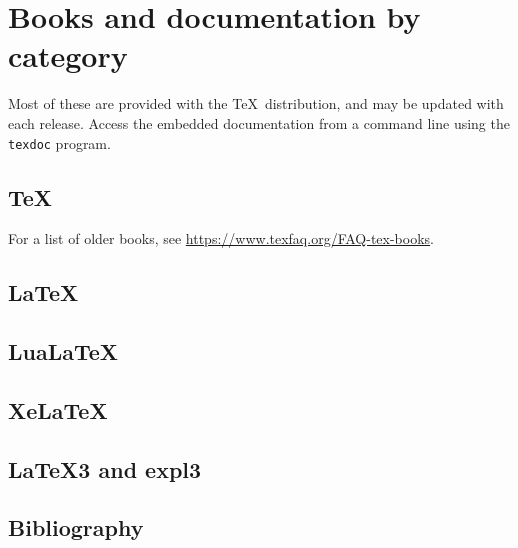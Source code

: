 \documentclass{article}
\newcommand*{\XeTeXrevE}
{\protect\hspace{-.1667em}\protect\raisebox{-.5ex}{\protect\reflectbox{E}}\protect\hspace{-.125em}}
\providecommand*{\XeLaTeX}{\mbox{X\XeTeXrevE\LaTeX}}
\def\pkg#1{#1}%
\def\TeX{TeX}%
\def\LaTeX{LaTeX}%
\def\XeLaTeX{XeLaTeX}%
\renewcommand*{\pkg}[1]{#1}
\renewcommand*{\XeLaTeX}{XeLaTeX}
\renewcommand*{\TeX}{TeX}
\renewcommand*{\LaTeX}{LaTeX}
\begin{document}
\printbibliography[
    heading=none,
    category=printedbooks,
]


\section{Books and documentation by category}

Most of these are provided with the \TeX\ distribution, and may be updated
with each release.
Access the embedded documentation from a command line using the \texttt{texdoc}
program.

\subsection{\TeX}

For a list of older books, see \url{https://www.texfaq.org/FAQ-tex-books}.

\printbibliography[
    heading=none,
    category=TeX,
]


\subsection{\LaTeX}

\printbibliography[
    heading=none,
    category=LaTeX,
]


\subsection{Lua\LaTeX}

\printbibliography[
    heading=none,
    category=LuaLaTeX,
]


\subsection{\XeLaTeX}

\printbibliography[
    heading=none,
    category=XeLaTeX,
]


\subsection{\LaTeX3 and \pkg{expl3}}

\printbibliography[
    heading=none,
    category=expl3,
]


\subsection{Bibliography}

\printbibliography[
    heading=none,
    category=bibliography,
]
\end{document}

